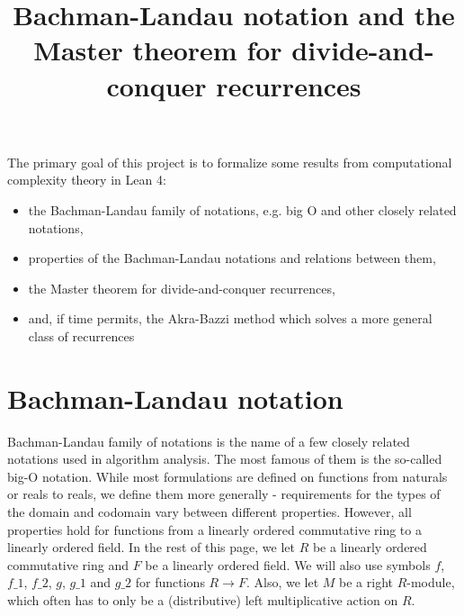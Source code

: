 %

\title{Bachman-Landau notation and the Master theorem for divide-and-conquer recurrences}

The primary goal of this project is to formalize some results from computational 
complexity theory in Lean 4:
\begin{itemize}
\item the Bachman-Landau family of notations, e.g. big O and other closely related notations,
\item properties of the Bachman-Landau notations and relations between them,
\item the Master theorem for divide-and-conquer recurrences,
\item and, if time permits, the Akra-Bazzi method which solves a more general class of recurrences
\end{itemize}

\section{Bachman-Landau notation}

Bachman-Landau family of notations is the name of a few closely related notations used in 
algorithm analysis. The most famous of them is the so-called big-O notation. While
most formulations are defined on functions from naturals or reals to reals, we define 
them more generally - requirements for the types of the domain and codomain vary between 
different properties. However, all properties hold for functions from a linearly ordered 
commutative ring to a linearly ordered field. In the rest of this page, we let $R$ be a linearly 
ordered commutative ring and $F$ be a linearly ordered field. We will also use symbols $f$, 
$f\_1$, $f\_2$, $g$, $g\_1$ and $g\_2$ for functions $R \to F$. Also, we let $M$ be 
a right $R$-module, which often has to only be a (distributive) left multiplicative action
on $R$.

